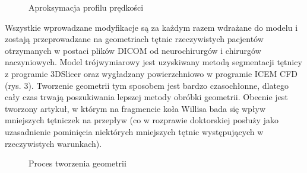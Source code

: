 \documentclass[11pt]{article} %
\begin{document}
\begin{figure}[H] %
\caption{Aproksymacja profilu prędkości}
\label{fig:speciation}
\end{figure}


Wszystkie wprowadzane modyfikacje są za każdym razem wdrażane do modelu i zostają przeprowadzane na geometriach tętnic rzeczywistych pacjentów otrzymanych w postaci plików DICOM od  neurochirurgów i chirurgów naczyniowych. Model trójwymiarowy jest uzyskiwany metodą segmentacji tętnicy z programie 3DSlicer oraz wygładzany powierzchniowo w programie ICEM CFD (rys. 3). Tworzenie geometrii tym sposobem jest bardzo czasochłonne, dlatego cały czas trwają poszukiwania lepszej metody obróbki geometrii. Obecnie jest tworzony artykuł, w którym na fragmencie koła Willisa bada się wpływ mniejszych tętniczek na przepływ (co w rozprawie doktorskiej posłuży jako uzasadnienie pominięcia niektórych mniejszych tętnic występujących w rzeczywistych warunkach).

\begin{figure}[H] %
\caption{Proces tworzenia geometrii}
\label{fig:speciation}
\end{figure}
\end{document}

